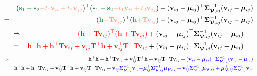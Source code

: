 \documentclass[12pt]{article}
\newcommand{\0}{\mathbf{0}}
\begin{document}
\begin{eqnarray*}
& & (\textcolor{seagreen}{\mathbf{s}_1 - \mathbf{s}_2} \textcolor{lightsalmon}{- t_1 \mathbf{v}_{ii} + t_2 \mathbf{v}_{jj}} )^{\top}(\textcolor{seagreen}{\mathbf{s}_1 - \mathbf{s}_2} \textcolor{lightsalmon}{- t_1 \mathbf{v}_{ii} + t_2 \mathbf{v}_{jj}} ) + (\mathbf{v}_{ij} - \boldsymbol{\mu}_{ij})^{\top}\boldsymbol{\Sigma}_{\boldsymbol{\mathcal{V}}, ij}^{-1} (\mathbf{v}_{ij} - \boldsymbol{\mu}_{ij}) \\
& = & ( \textcolor{seagreen}{\mathbf{h}} \textcolor{lightsalmon}{+ \mathbf{T} \mathbf{v}_{ij}} )^{\top} ( \textcolor{seagreen}{\mathbf{h}}   \textcolor{lightsalmon}{+ \mathbf{T} \mathbf{v}_{ij}} ) + (\mathbf{v}_{ij} - \boldsymbol{\mu}_{ij})^{\top} \boldsymbol{\Sigma}_{\boldsymbol{\mathcal{V}}, ij}^{-1} (\mathbf{v}_{ij} - \boldsymbol{\mu}_{ij})
\end{eqnarray*}
\begin{eqnarray*}
& \Rightarrow & \textcolor{red}{(\mathbf{h} + \mathbf{T} \mathbf{v}_{ij} )^{\top} ( \mathbf{h} + \mathbf{T} \mathbf{v}_{ij}  )} + (\mathbf{v}_{ij} - \boldsymbol{\mu}_{ij})^{\top} \boldsymbol{\Sigma}_{\boldsymbol{\mathcal{V}}, ij}^{-1} (\mathbf{v}_{ij} - \boldsymbol{\mu}_{ij}) \\
& = & \textcolor{red}{\mathbf{h}^{\top} \mathbf{h} + \mathbf{h}^{\top} \mathbf{T} \mathbf{v}_{ij}  + \mathbf{v}_{ij}^{\top}  \mathbf{T}^{\top} \mathbf{h}  + \mathbf{v}_{ij}^{\top}  \mathbf{T}^{\top} \mathbf{T} \mathbf{v}_{ij} } + (\mathbf{v}_{ij} - \boldsymbol{\mu}_{ij})^{\top} \boldsymbol{\Sigma}_{\boldsymbol{\mathcal{V}}, ij}^{-1} (\mathbf{v}_{ij} - \boldsymbol{\mu}_{ij})
\end{eqnarray*}
\begin{eqnarray*}
& \Rightarrow & \mathbf{h}^{\top} \mathbf{h} + \mathbf{h}^{\top} \mathbf{T} \mathbf{v}_{ij}  + \mathbf{v}_{ij}^{\top}  \mathbf{T}^{\top} \mathbf{h}  + \mathbf{v}_{ij}^{\top}  \mathbf{T}^{\top} \mathbf{T} \mathbf{v}_{ij} + \textcolor{blue}{ (\mathbf{v}_{ij} - \boldsymbol{\mu}_{ij})^{\top} \boldsymbol{\Sigma}_{\boldsymbol{\mathcal{V}}, ij}^{-1} (\mathbf{v}_{ij} - \boldsymbol{\mu}_{ij})} \\
& = & \mathbf{h}^{\top} \mathbf{h} + \mathbf{h}^{\top} \mathbf{T} \mathbf{v}_{ij}  + \mathbf{v}_{ij}^{\top}  \mathbf{T}^{\top} \mathbf{h}  + \mathbf{v}_{ij}^{\top}  \mathbf{T}^{\top} \mathbf{T} \mathbf{v}_{ij} + \textcolor{blue}{ \mathbf{v}_{ij}^{\top} \boldsymbol{\Sigma}_{\boldsymbol{\mathcal{V}}, ij}^{-1} \mathbf{v}_{ij} } \textcolor{blue}{ + \boldsymbol{\mu}_{ij}^{\top} \boldsymbol{\Sigma}_{\boldsymbol{\mathcal{V}}, ij}^{-1} \boldsymbol{\mu}_{\boldsymbol{\mathcal{V}}, ij} + \mathbf{v}_{ij}^{\top} \boldsymbol{\Sigma}_{\boldsymbol{\mathcal{V}}, ij}^{-1} \boldsymbol{\mu}_{\boldsymbol{\mathcal{V}}, ij} + \boldsymbol{\mu}_{\boldsymbol{\mathcal{V}}, ij}^{\top} \boldsymbol{\Sigma}_{\boldsymbol{\mathcal{V}}, ij}^{-1} \mathbf{v}_{ij}}
\end{eqnarray*}
\end{document}
